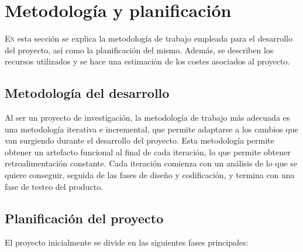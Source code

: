 \chapter{Metodología y planificación}
\label{chap:Metodoloxía e planificación}
\lettrine{E}{n} esta sección se explica la metodología de trabajo empleada para el desarrollo del proyecto, así como la planificación del mismo.
Además, se describen los recursos utilizados y se hace una estimación de los costes asociados al proyecto.

\section{Metodología del desarrollo}
\label{sec:Metodoloxía do desenvolvemento}

Al ser un proyecto de investigación, la metodología de trabajo más adecuada es una metodología iterativa e incremental, que permite adaptarse a los cambios que van surgiendo durante el desarrollo del proyecto.
Esta metodología permite obtener un artefacto funcional al final de cada iteración, lo que permite obtener retroalimentación constante.
Cada iteración comienza con un análisis de lo que se quiere conseguir, seguida de las fases de diseño y codificación, y termina con una fase de testeo del producto.

\section{Planificación del proyecto}
\label{sec:Planificación do proxecto}
El proyecto inicialmente se divide en las siguientes fases principales:

